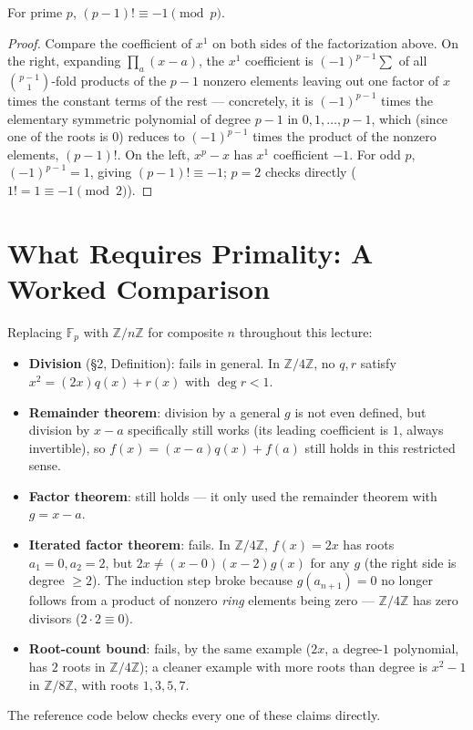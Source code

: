 \documentclass[11pt]{article}
\begin{document}
\begin{theorembox}
For prime $p$, $(p-1)! \equiv -1 \pmod p$.
\end{theorembox}
\begin{proof}
Compare the coefficient of $x^1$ on both sides of the factorization
above. On the right, expanding $\prod_a (x-a)$, the $x^1$ coefficient is
$(-1)^{p-1}\!\!\sum$ of all $\binom{p-1}{1}$-fold products of the
$p-1$ nonzero elements leaving out one factor of $x$ times the constant
terms of the rest --- concretely, it is $(-1)^{p-1}$ times the elementary
symmetric polynomial of degree $p-1$ in $0,1,\ldots,p-1$, which (since
one of the roots is $0$) reduces to $(-1)^{p-1}$ times the product of the
nonzero elements, $(p-1)!$. On the left, $x^p - x$ has $x^1$ coefficient
$-1$. For odd $p$, $(-1)^{p-1}=1$, giving $(p-1)! \equiv -1$; $p=2$ checks
directly ($1! = 1 \equiv -1 \pmod 2$).
\end{proof}

\section{What Requires Primality: A Worked Comparison}
\begin{examplebox}
Replacing $\mathbb{F}_p$ with $\mathbb{Z}/n\mathbb{Z}$ for composite $n$
throughout this lecture:
\begin{itemize}[leftmargin=1.5em]
  \item \textbf{Division} (\S2, Definition): fails in general. In
        $\mathbb{Z}/4\mathbb{Z}$, no $q,r$ satisfy $x^2 = (2x)q(x)+r(x)$
        with $\deg r < 1$.
  \item \textbf{Remainder theorem}: division by a general $g$ is not even
        defined, but division by $x-a$ specifically still works (its
        leading coefficient is $1$, always invertible), so
        $f(x)=(x-a)q(x)+f(a)$ still holds in this restricted sense.
  \item \textbf{Factor theorem}: still holds --- it only used the
        remainder theorem with $g=x-a$.
  \item \textbf{Iterated factor theorem}: fails. In
        $\mathbb{Z}/4\mathbb{Z}$, $f(x)=2x$ has roots $a_1=0,a_2=2$, but
        $2x \ne (x-0)(x-2)g(x)$ for any $g$ (the right side is degree
        $\ge 2$). The induction step broke because
        $g(a_{n+1})=0$ no longer follows from a product of nonzero
        \emph{ring} elements being zero --- $\mathbb{Z}/4\mathbb{Z}$ has
        zero divisors ($2\cdot 2 \equiv 0$).
  \item \textbf{Root-count bound}: fails, by the same example ($2x$, a
        degree-$1$ polynomial, has $2$ roots in
        $\mathbb{Z}/4\mathbb{Z}$); a cleaner example with more roots than
        degree is $x^2-1$ in $\mathbb{Z}/8\mathbb{Z}$, with roots
        $1,3,5,7$.
\end{itemize}
The reference code below checks every one of these claims directly.
\end{examplebox}
\end{document}
